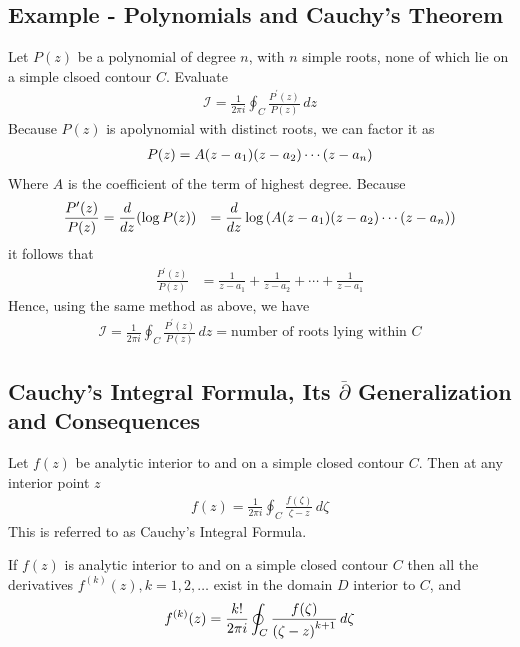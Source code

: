     \subsection{Example - Polynomials and Cauchy's Theorem}
    Let $P(z)$ be a polynomial of degree $n$, with $n$ simple roots, none of
    which lie on a simple clsoed contour $C$. Evaluate
    \begin{align*}
        \mathcal{I}=\frac{1}{2\pi i} \oint_C \frac{P^\prime(z)}{P(z)} \, dz
    \end{align*}
    Because $P(z)$ is apolynomial with distinct roots, we can factor it as
    \begin{align*}
        P(z)=A{\left( z-a_1 \right)}{\left( z-a_2 \right)}\cdots{\left( z-a_n \right)}
    \end{align*}
    Where $A$ is the coefficient of the term of highest degree. Because
    \begin{align*}
        \frac{P^\prime(z)}{P(z)} &= \frac{d}{dz} {\left( \log P(z) \right)}
        &= \frac{d}{dz} \log {\left( A{\left( z-a_1 \right)}{\left( z-a_2 \right)}\cdots{\left( z-a_n \right)} \right)}
    \end{align*}
    it follows that
    \begin{align*}
        \frac{P^\prime(z)}{P(z)} &= \frac{1}{z-a_1} +\frac{1}{z-a_2} +
        \cdots + \frac{1}{z-a_1}
    \end{align*}
    Hence, using the same method as above, we have
    \begin{align*}
        \mathcal{I}=\frac{1}{2\pi i} \oint_C \frac{P^\prime(z)}{P(z)} \, dz
        = \text{number of roots lying within } C
    \end{align*}

    \subsection{Cauchy's Integral Formula, Its $\overline{\partial}$
    Generalization and Consequences}

    \begin{thm}
        Let $f(z)$ be analytic interior to and on a simple closed contour
        $C$. Then at any interior point $z$
        \begin{align*}
            f(z) = \frac{1}{2\pi i}
            \oint_C \frac{f(\zeta)}{\zeta - z} \, d\zeta
        \end{align*}
        This is referred to as Cauchy's Integral Formula.
    \end{thm}

    \begin{thm}
        If $f(z)$ is analytic interior to and on a simple closed contour $C$
        then all the derivatives $f^{(k)}(z),k=1,2,\ldots$ exist in the
        domain $D$ interior to $C$, and
        \begin{align*}
            f^{(k)}(z) = \frac{k!}{2 \pi i}
            \oint_C \frac{f(\zeta)}{{\left( \zeta - z \right)}^{k+1}} \, d\zeta
        \end{align*}
    \end{thm}

